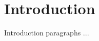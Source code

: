 \documentclass[letterpaper, 10 pt, conference]{ieeeconf}
\begin{document}
\section{Introduction}

Introduction paragraphs ... 





\end{document}
